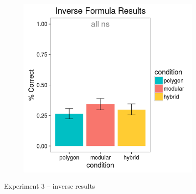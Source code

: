 \documentclass[man,10pt]{apa6}
\begin{document}
\begin{figure}[H]
\begin{subfigure}[c]{0.3\textwidth}
\end{subfigure}
~
\begin{subfigure}[c]{0.3\textwidth}
\centering
\includegraphics[width=\textwidth]{figures/3/in_f_r.png}
\end{subfigure}
\caption{Experiment 3 -- inverse results}
\label{ex3_in}
\end{figure} 
\end{document}
